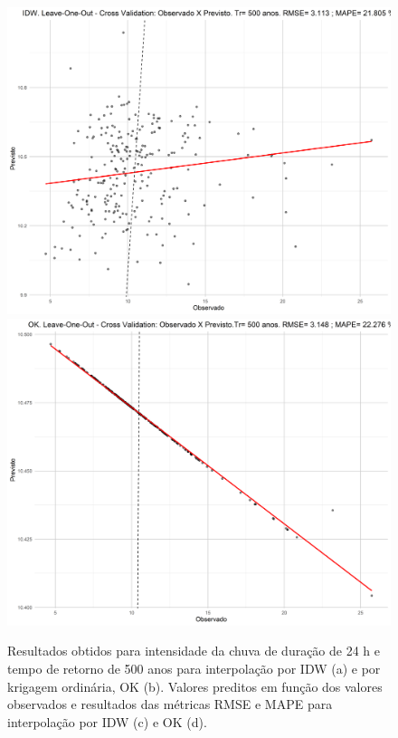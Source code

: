 \documentclass[
]{agujournal2019}
\begin{document}
\begin{figure}
\begin{minipage}{\linewidth}
{}


\end{minipage}%
\newline
\begin{minipage}{\linewidth}
\includegraphics{Figuras/Figura14c.png}
\includegraphics{Figuras/Figura14d.png}\end{minipage}%

\caption{\label{fig-Figura14}Resultados obtidos para intensidade da
chuva de duração de 24 h e tempo de retorno de 500 anos para
interpolação por IDW (a) e por krigagem ordinária, OK (b). Valores
preditos em função dos valores observados e resultados das métricas RMSE
e MAPE para interpolação por IDW (c) e OK (d).}

\end{figure}%
\end{document}
